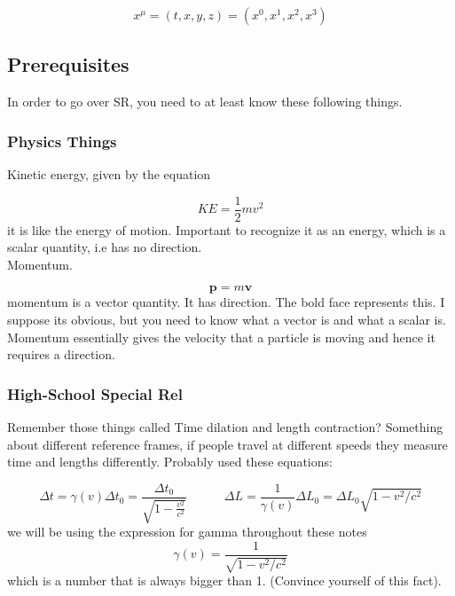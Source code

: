 \begin{equation}
  x^\mu =  (t,x,y,z) = (x^0,x^1, x^2,x^3)
\end{equation}

\subsection{Prerequisites}

In order to go over SR, you need to at least know these following things. 

\subsubsection{Physics Things}
Kinetic energy, given by the equation

\begin{equation}
KE = \frac{1}{2} m v^2
\end{equation}
it is like the energy of motion. Important to recognize it as an energy, which is a scalar quantity, i.e has no direction. \\

Momentum. 

\begin{equation}
  \mathbf{p} = m \mathbf{v}
\end{equation}
momentum is a vector quantity. It has direction. The bold face represents this. I suppose its obvious, but you need to know what a vector is and what a scalar is. Momentum essentially gives the velocity that a particle is moving and hence it requires a direction. 

\subsubsection{High-School Special Rel}

Remember those things called Time dilation and length contraction? Something about different reference frames, if people travel at different speeds they measure time and lengths differently. Probably used these equations:

\begin{equation}
  \Delta t = \gamma(v) \Delta t_0 = \frac{\Delta t_0}{\sqrt{1 - \frac{v^2}{c^2}}}  \quad \quad \quad \Delta L = \frac{1}{\gamma(v)} \Delta L_0 =\Delta L_0 \sqrt{1 - v^2/c^2} 
  \label{eq:specialrel}
\end{equation}
we will be using the expression for gamma throughout these notes
\begin{equation}
  \gamma(v) = \frac{1}{\sqrt{1 - v^2/c^2}}
\end{equation}
which is a number that is always bigger than 1. (Convince yourself of this fact). 


